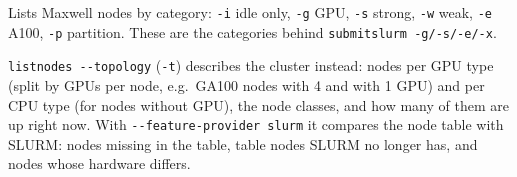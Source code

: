 \documentclass[11pt,a4paper]{article}
\newcommand{\cmd}[1]{\texttt{#1}}
\begin{document}
\begin{description}[style=nextline,leftmargin=1.5em]
  \item[\cmd{listnodes}] Lists Maxwell nodes by category: \cmd{-i} idle only, \cmd{-g} GPU,
    \cmd{-s} strong, \cmd{-w} weak, \cmd{-e} A100, \cmd{-p} partition. These are the categories
    behind \cmd{submitslurm -g/-s/-e/-x}.

    \cmd{listnodes -{}-topology} (\cmd{-t}) describes the cluster instead: nodes per GPU type (split
    by GPUs per node, e.g.\ GA100 nodes with 4 and with 1 GPU) and per CPU type (for nodes without GPU), the node classes, and how many of them are up right now.
    With \cmd{-{}-feature-provider slurm} it compares the node table with SLURM: nodes missing in
    the table, table nodes SLURM no longer has, and nodes whose hardware differs.


\end{description}
\end{document}
